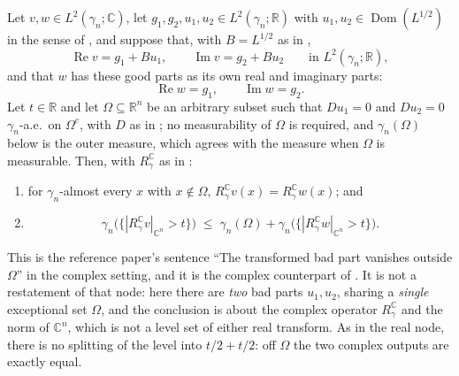 \begin{lemma}
Let $v, w \in L^2(\gamma_n;\mathbb{C})$, let
$g_1, g_2, u_1, u_2 \in L^2(\gamma_n;\mathbb{R})$ with
$u_1, u_2 \in \operatorname{Dom}(L^{1/2})$ in the sense of
, and suppose that, with $B = L^{1/2}$ as in
,
\[
  \operatorname{Re} v = g_1 + Bu_1, \qquad \operatorname{Im} v = g_2 + Bu_2
  \qquad\text{in } L^2(\gamma_n;\mathbb{R}),
\]
and that $w$ has these good parts as its own real and imaginary parts:
\[
  \operatorname{Re} w = g_1, \qquad \operatorname{Im} w = g_2 .
\]
Let $t \in \mathbb{R}$ and let $\Omega \subseteq \mathbb{R}^n$ be an arbitrary
subset such that $Du_1 = 0$ and $Du_2 = 0$ $\gamma_n$-a.e.\ on $\Omega^c$, with
$D$ as in ; no measurability of $\Omega$ is required, and
$\gamma_n(\Omega)$ below is the outer measure, which agrees with the measure
when $\Omega$ is measurable.  Then, with $R_\gamma^{\mathbb{C}}$ as in
:
\begin{enumerate}
\item for $\gamma_n$-almost every $x$ with $x \notin \Omega$,
  $R_\gamma^{\mathbb{C}} v(x) = R_\gamma^{\mathbb{C}} w(x)$; and
\item
\[
  \gamma_n\bigl(\{|R_\gamma^{\mathbb{C}} v|_{\mathbb{C}^n} > t\}\bigr)
    \;\leq\; \gamma_n(\Omega)
      + \gamma_n\bigl(\{|R_\gamma^{\mathbb{C}} w|_{\mathbb{C}^n} > t\}\bigr) .
\]
\end{enumerate}

This is the reference paper's sentence ``The transformed bad part vanishes
outside $\Omega$'' in the complex setting, and it is the complex counterpart of
.  It is not a restatement of that node: here
there are \emph{two} bad parts $u_1, u_2$, sharing a \emph{single} exceptional
set $\Omega$, and the conclusion is about the complex operator
$R_\gamma^{\mathbb{C}}$ and the norm of $\mathbb{C}^n$, which is not a level set
of either real transform.  As in the real node, there is no splitting of the
level into $t/2 + t/2$: off $\Omega$ the two complex outputs are exactly equal.
\end{lemma}

